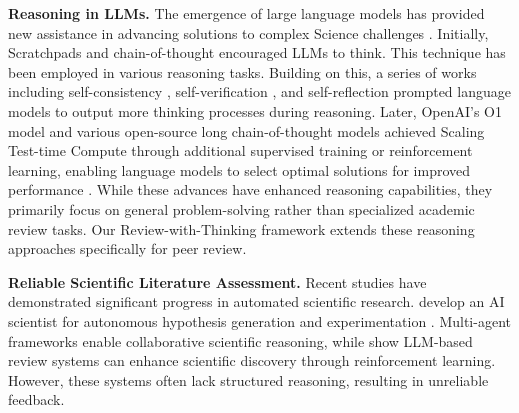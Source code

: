 \documentclass{article}
\begin{document}
\textbf{Reasoning in LLMs.} The emergence of large language models \cite{achiam2023gpt,touvron2023llama,bai2023qwen} has provided new assistance in advancing solutions to complex Science challenges \cite{hendrycksmath2021}. Initially, Scratchpads and chain-of-thought \cite{akyurek2022learning,nye2021show,weichain} encouraged LLMs to think. This technique has been employed in various reasoning tasks. Building on this, a series of works including self-consistency \cite{wangself}, self-verification \cite{weng2023large}, and self-reflection \cite{madaan2024self} prompted language models to output more thinking processes during reasoning. Later, OpenAI's O1 model \cite{jaech2024openai} and various open-source long chain-of-thought models \cite{guo2025deepseek} achieved Scaling Test-time Compute \cite{yao2024tree,guan2025rstarmathsmallllmsmaster} through additional supervised training or reinforcement learning, enabling language models to select optimal solutions for improved performance \cite{xiang20252reasoningllmslearning}. While these advances have enhanced reasoning capabilities, they primarily focus on general problem-solving rather than specialized academic review tasks. Our Review-with-Thinking framework extends these reasoning approaches specifically for peer review.

\textbf{Reliable Scientific Literature Assessment.} Recent studies have demonstrated significant progress in automated scientific research. \citep{chris2024the} develop an AI scientist for autonomous hypothesis generation and experimentation \citep{langley1987scientific,daniil2023emergent,Aider,zonglin2023large,li-etal-2024-simulating,hu2024nova}. Multi-agent frameworks \citep{ghafarollahi2024sciagents, rasal2024navigating, su2024two} enable collaborative scientific reasoning, while \citep{yixuan2024cycleresearcher} show LLM-based review systems can enhance scientific discovery through reinforcement learning. However, these systems often lack structured reasoning, resulting in unreliable feedback.
\end{document}
